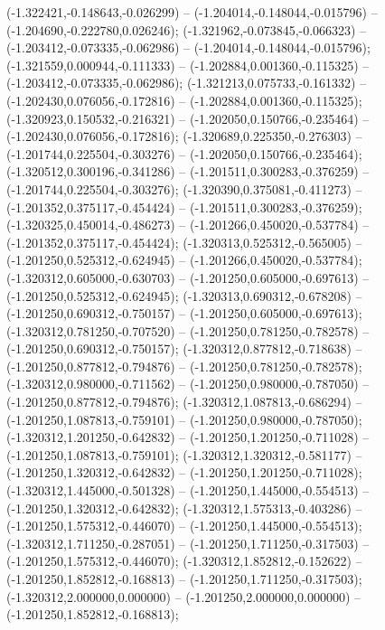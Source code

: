  (-1.322421,-0.148643,-0.026299) -- (-1.204014,-0.148044,-0.015796) -- (-1.204690,-0.222780,0.026246);
 (-1.321962,-0.073845,-0.066323) -- (-1.203412,-0.073335,-0.062986) -- (-1.204014,-0.148044,-0.015796);
 (-1.321559,0.000944,-0.111333) -- (-1.202884,0.001360,-0.115325) -- (-1.203412,-0.073335,-0.062986);
 (-1.321213,0.075733,-0.161332) -- (-1.202430,0.076056,-0.172816) -- (-1.202884,0.001360,-0.115325);
 (-1.320923,0.150532,-0.216321) -- (-1.202050,0.150766,-0.235464) -- (-1.202430,0.076056,-0.172816);
 (-1.320689,0.225350,-0.276303) -- (-1.201744,0.225504,-0.303276) -- (-1.202050,0.150766,-0.235464);
 (-1.320512,0.300196,-0.341286) -- (-1.201511,0.300283,-0.376259) -- (-1.201744,0.225504,-0.303276);
 (-1.320390,0.375081,-0.411273) -- (-1.201352,0.375117,-0.454424) -- (-1.201511,0.300283,-0.376259);
 (-1.320325,0.450014,-0.486273) -- (-1.201266,0.450020,-0.537784) -- (-1.201352,0.375117,-0.454424);
 (-1.320313,0.525312,-0.565005) -- (-1.201250,0.525312,-0.624945) -- (-1.201266,0.450020,-0.537784);
 (-1.320312,0.605000,-0.630703) -- (-1.201250,0.605000,-0.697613) -- (-1.201250,0.525312,-0.624945);
 (-1.320313,0.690312,-0.678208) -- (-1.201250,0.690312,-0.750157) -- (-1.201250,0.605000,-0.697613);
 (-1.320312,0.781250,-0.707520) -- (-1.201250,0.781250,-0.782578) -- (-1.201250,0.690312,-0.750157);
 (-1.320312,0.877812,-0.718638) -- (-1.201250,0.877812,-0.794876) -- (-1.201250,0.781250,-0.782578);
 (-1.320312,0.980000,-0.711562) -- (-1.201250,0.980000,-0.787050) -- (-1.201250,0.877812,-0.794876);
 (-1.320312,1.087813,-0.686294) -- (-1.201250,1.087813,-0.759101) -- (-1.201250,0.980000,-0.787050);
 (-1.320312,1.201250,-0.642832) -- (-1.201250,1.201250,-0.711028) -- (-1.201250,1.087813,-0.759101);
 (-1.320312,1.320312,-0.581177) -- (-1.201250,1.320312,-0.642832) -- (-1.201250,1.201250,-0.711028);
 (-1.320312,1.445000,-0.501328) -- (-1.201250,1.445000,-0.554513) -- (-1.201250,1.320312,-0.642832);
 (-1.320312,1.575313,-0.403286) -- (-1.201250,1.575312,-0.446070) -- (-1.201250,1.445000,-0.554513);
 (-1.320312,1.711250,-0.287051) -- (-1.201250,1.711250,-0.317503) -- (-1.201250,1.575312,-0.446070);
 (-1.320312,1.852812,-0.152622) -- (-1.201250,1.852812,-0.168813) -- (-1.201250,1.711250,-0.317503);
 (-1.320312,2.000000,0.000000) -- (-1.201250,2.000000,0.000000) -- (-1.201250,1.852812,-0.168813);
